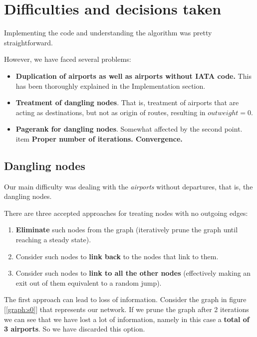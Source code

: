 \documentclass[10pt, a4paper]{article}
\begin{document}
\section{Difficulties and decisions taken}

Implementing the code and understanding the algorithm was pretty straightforward.

However, we have faced several problems:
\begin{itemize}
    \item \textbf{Duplication of airports as well as airports without IATA code.} This has been thoroughly explained in the Implementation section.
    \item \textbf{Treatment of dangling nodes}. That is, treatment of airports that are acting as destinations, but not as origin of routes, resulting in $outweight = 0$.
    \item \textbf{Pagerank for dangling nodes}. Somewhat affected by the second point.
    item \textbf{Proper number of iterations. Convergence.} 
\end{itemize}

\subsection{Dangling nodes}
Our main difficulty was dealing with the \textit{airports} without departures, that is, the dangling nodes.

There are three accepted approaches for treating nodes with no outgoing edges\cite{pageRank}:
\begin{enumerate}
    \item \textbf{Eliminate} such nodes from the graph (iteratively prune the graph until reaching a steady state). 
    \item Consider such nodes to\textbf{ link back} to the nodes that link to them.
    \item Consider such nodes to \textbf{link to all the other nodes} (effectively making an exit out of them equivalent to a random jump).
\end{enumerate}

The first approach can lead to loss of information. Consider the graph in figure [\ref{graph:s0}] that represents our network. If we prune the graph after 2 iterations we can see that we have lost a lot of information, namely in this case a \textbf{total of 3 airports}. So we have discarded this option.


\end{document}
